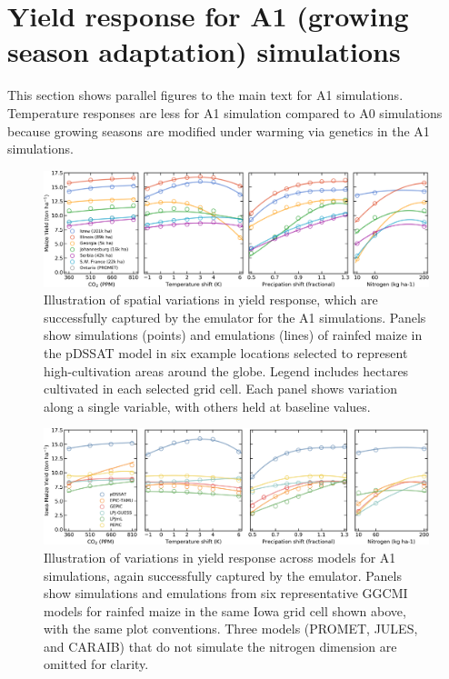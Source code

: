 \documentclass[12pt]{article}
\begin{document}
\clearpage
\section{Yield response for A1 (growing season adaptation) simulations}
\begin{flushleft}
This section shows parallel figures to the main text for A1 simulations. Temperature responses are less for A1 simulation compared to A0 simulations because growing seasons are modified under warming via genetics in the A1 simulations.
\end{flushleft}

\begin{figure}[h!]
\centering
    \includegraphics[width=16.3cm]{regression_exampleA1.png}
    \caption{
    Illustration of spatial variations in yield response, which are successfully captured by the emulator for the A1 simulations. 
    Panels show simulations (points) and emulations (lines) of rainfed maize in the pDSSAT model in six example locations selected to represent high-cultivation areas around the globe. 
    Legend includes hectares cultivated in each selected grid cell. 
    Each panel shows variation along a single variable, with others held at baseline values. 
    }
   \label{fig:regression}
\end{figure}

\begin{figure}[h!]
\centering
    \includegraphics[width=16.3cm]{regression_exampleA1_2.png}
    \caption{
    Illustration of variations in yield response across models for A1 simulations, again successfully captured by the emulator. 
    Panels show simulations and emulations from six representative GGCMI models for rainfed maize in the same Iowa grid cell shown above, with the same plot conventions. 
    Three models (PROMET, JULES, and CARAIB) that do not simulate the nitrogen dimension are omitted for clarity. 
    }
   \label{fig:regression_2}
\end{figure}
\end{document}
